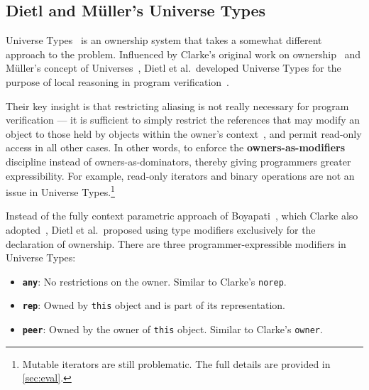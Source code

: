 \documentclass{acm_proc_article-sp}
\begin{document}

%


\subsection{Dietl and M\"{u}ller's Universe Types}
\label{subsec:dietl}

Universe Types~\cite{cunningham08ut} is an ownership system that takes a
somewhat different approach to the problem. Influenced by Clarke's original
work on ownership~\cite{clarke98ownership} and M\"{u}ller's concept of
Universes~\cite{muller99universes}, Dietl et al.\ developed Universe Types for
the purpose of local reasoning in program verification~\cite{cunningham08ut,
dietl09gut, dietl11gut}.

Their key insight is that restricting aliasing is not really necessary for
program verification --- it is sufficient to simply restrict the references
that may modify an object to those held by objects within the owner's
context~\cite{dietl11gut}, and permit read-only access in all other cases. In
other words, to enforce the \textbf{owners-as-modifiers} discipline instead of
owners-as-dominators, thereby giving programmers greater expressibility. For
example, read-only iterators and binary operations are not an issue in Universe
Types.\footnote{Mutable iterators are still problematic. The full details are
provided in \cref{sec:eval}.}

Instead of the fully context parametric approach of
Boyapati~\cite{boyapati04safejava}, which Clarke also
adopted~\cite{clarke03ownership}, Dietl et al.\ proposed using type modifiers
exclusively for the declaration of ownership. There are three
programmer-expressible modifiers in Universe Types:
\begin{itemize}
	\item \textbf{\lstinline|any|}:
		No restrictions on the owner. Similar to Clarke's \lstinline|norep|.
	\item \textbf{\lstinline|rep|}:
		Owned by \lstinline|this| object and is part of its representation.
	\item \textbf{\lstinline|peer|}:
		Owned by the owner of \lstinline|this| object. Similar to Clarke's 
		\lstinline|owner|.
\end{itemize}
\end{document}
